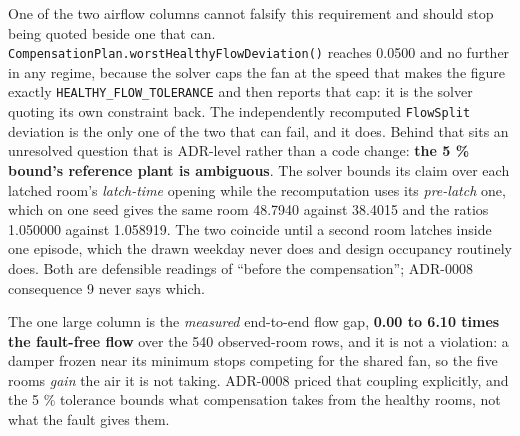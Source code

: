 One of the two airflow columns cannot falsify this requirement and should stop being quoted beside
one that can. \texttt{CompensationPlan.worstHealthyFlowDeviation()} reaches 0.0500 and no further in
any regime, because the solver caps the fan at the speed that makes the figure exactly
\texttt{HEALTHY\_FLOW\_TOLERANCE} and then reports that cap: it is the solver quoting its own
constraint back. The independently recomputed \texttt{FlowSplit} deviation is the only one of the two
that can fail, and it does. Behind that sits an unresolved question that is ADR-level rather than a
code change: \textbf{the 5 \% bound's reference plant is ambiguous}. The solver bounds its claim over
each latched room's \emph{latch-time} opening while the recomputation uses its \emph{pre-latch} one,
which on one seed gives the same room 48.7940 against 38.4015 and the ratios 1.050000 against
1.058919. The two coincide until a second room latches inside one episode, which the drawn weekday
never does and design occupancy routinely does. Both are defensible readings of ``before the
compensation''; ADR-0008 consequence 9 never says which.

The one large column is the \emph{measured} end-to-end flow gap, \textbf{0.00 to 6.10 times the
fault-free flow} over the 540 observed-room rows, and it is not a violation: a damper frozen near its
minimum stops competing for the shared fan, so the five rooms \emph{gain} the air it is not taking.
ADR-0008 priced that coupling explicitly, and the 5 \% tolerance bounds what compensation takes from
the healthy rooms, not what the fault gives them.
